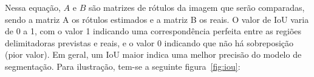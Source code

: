 Nessa equação, $A$ e $B$ são matrizes de rótulos da imagem que serão
comparadas, sendo a matriz A os rótulos estimados e a matriz B os
reais. O valor de IoU varia de 0 a 1, com o valor 1 indicando uma
correspondência perfeita entre as regiões delimitadoras previstas e
reais, e o valor 0 indicando que não há sobreposição (pior valor). Em
geral, um IoU maior indica uma melhor precisão do modelo de
segmentação. Para ilustração, tem-se a seguinte figura~\ref{fig:iou}:

\begin{figure}[h!]
        \captionsetup{width=12cm}
		\centering
\end{figure}
\FloatBarrier{}
